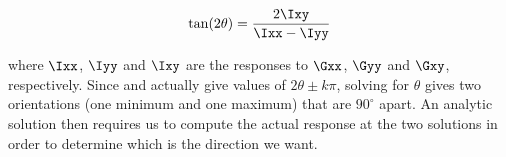 \begin{equation}
\tan(2\theta) = \frac{2\Ixy}{\Ixx-\Iyy}
\label{e:2d}
\end{equation}

\noindent where $\Ixx$, $\Iyy$ and $\Ixy$ are the responses to $\Gxx$, $\Gyy$ and $\Gxy$, respectively. Since  and  actually give values of $2\theta \pm k\pi$, solving for $\theta$ gives two orientations (one minimum and one maximum) that are $90^\circ$ apart. An analytic solution then requires us to compute the actual response at the two solutions in order to determine which is the direction we want. 

